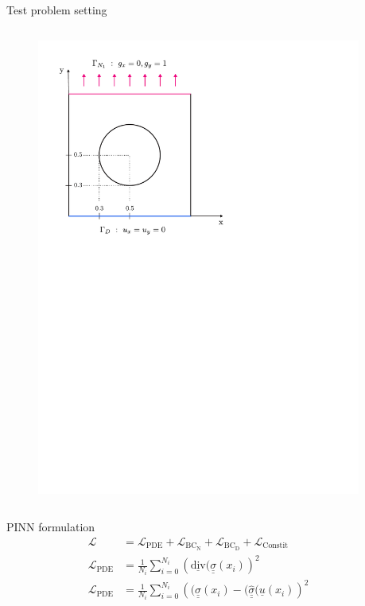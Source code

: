 \documentclass[aspectratio=1610, 10pt]{beamer}
\def\doubleunderline#1{\underline{\underline{#1}}}
\begin{document}
\begin{frame}
\begin{columns}
\begin{column}{0.6\textwidth}
\begin{blueblockshadow}{Test problem setting}
\begin{columns}
\begin{column}{0.4\textwidth}
\begin{figure}
        \includegraphics[trim={0 17cm 8cm 1cm},clip,width = 0.95\linewidth]{Figures/PINN_problem_1.pdf}    
        \end{figure}
    \end{column}
    \end{columns}
    \end{blueblockshadow}

    \vspace{0.3cm}

    \begin{blueblockshadow}{PINN formulation}
    \scriptsize{
        \begin{align*}
            \mathcal{L} &= \mathcal{L}_{\mathrm{PDE}} + \mathcal{L}_{\mathrm{BC_N}}+ \mathcal{L}_{\mathrm{BC_D}}+ \mathcal{L}_{\mathrm{Constit}}\\
            \mathcal{L}_{\mathrm{PDE}} &=  \frac{1}{N_i}\sum_{i=0}^{N_i} \left(\underline{\mathrm{div}}  (\doubleunderline{ \sigma}(x_i)\right)^2 \\
            \mathcal{L}_{\mathrm{PDE}} &=  \frac{1}{N_i}\sum_{i=0}^{N_i} \left((\doubleunderline{ \sigma}(x_i) - (\doubleunderline{ \hat{\sigma}}(\underline{u}(x_i)\right)^2
        \end{align*}}
    \end{blueblockshadow}
    \end{column}
    \begin{column}{0.33\textwidth}


\end{column}
\end{columns}
\end{frame}
\end{document}
